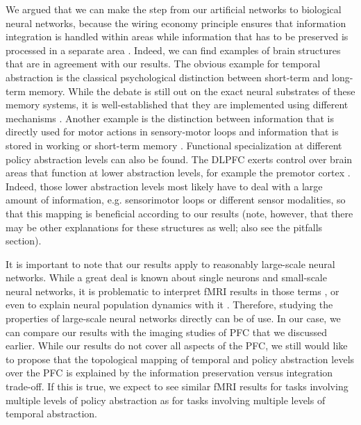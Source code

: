 \documentclass[10pt,a4paper]{report}
\begin{document}
We argued that we can make the step from our artificial networks to biological neural networks, because the wiring economy principle ensures that information integration is handled within areas while information that has to be preserved is processed in a separate area \citep{Sporns2010}. Indeed, we can find examples of brain structures that are in agreement with our results. The obvious example for temporal abstraction is the classical psychological distinction between short-term and long-term memory. While the debate is still out on the exact neural substrates of these memory systems, it is well-established that they are implemented using different mechanisms \citep{Eichenbaum2000}. Another example is the distinction between information that is directly used for motor actions in sensory-motor loops and information that is stored in working or short-term memory \citep{Fuster2001}. Functional specialization at different policy abstraction levels can also be found. The DLPFC exerts control over brain areas that function at lower abstraction levels, for example the premotor cortex \citep{Koechlin2003}. Indeed, those lower abstraction levels most likely have to deal with a large amount of information, e.g. sensorimotor loops or different sensor modalities, so that this mapping is beneficial according to our results (note, however, that there may be other explanations for these structures as well; also see the pitfalls section).

It is important to note that our results apply to reasonably large-scale neural networks. While a great deal is known about single neurons and small-scale neural networks, it is problematic to interpret fMRI results in those terms \citep{Nir2007, Sirotin2009}, or even to explain neural population dynamics with it \citep{Tiesinga2008, Wang2010, Belitski2008}. Therefore, studying the properties of large-scale neural networks directly can be of use. In our case, we can compare our results with the imaging studies of PFC that we discussed earlier. While our results do not cover all aspects of the PFC, we still would like to propose that the topological mapping of temporal and policy abstraction levels over the PFC is explained by the information preservation versus integration trade-off. If this is true, we expect to see similar fMRI results for tasks involving multiple levels of policy abstraction as for tasks involving multiple levels of temporal abstraction.
\end{document}
